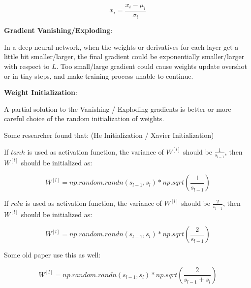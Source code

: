\documentclass{article}
\begin{document}
\[x_i = \frac{x_i - \mu_i}{\sigma_i}\]

\noindent \textbf{Gradient Vanishing/Exploding}:

\noindent In a deep neural network, when the weights or derivatives for each layer get a little bit smaller/larger, the final gradient could be exponentially smaller/larger with respect to \(L\). Too small/large gradient could cause weights update overshot or in tiny steps, and make training process unable to continue.

\bigskip

\noindent \textbf{Weight Initialization}:

\noindent A partial solution to the Vanishing / Exploding gradients is better or more careful choice of the random initialization of weights. 

\bigskip

\noindent Some researcher found that: (He Initialization / Xavier Initialization)

\bigskip

\noindent If \(tanh\) is used as activation function, the variance of \(W^{[l]}\) should be \(\frac{1}{s_{l - 1}}\), then \(W^{[l]}\) should be initialized as:

\[W^{[l]} = np.random.randn(s_{l - 1}, s_l) * np.sqrt(\frac{1}{s_{l - 1}}) \]

\noindent If \(relu\) is used as activation function, the variance of \(W^{[l]}\) should be \(\frac{2}{s_{l - 1}}\), then \(W^{[l]}\) should be initialized as:

\[W^{[l]} = np.random.randn(s_{l - 1}, s_l) * np.sqrt(\frac{2}{s_{l - 1}}) \]

\noindent Some old paper use this as well:

\[W^{[l]} = np.random.randn(s_{l - 1}, s_l) * np.sqrt(\frac{2}{s_{l - 1} + s_{l}}) \]

\printindex
\end{document}
